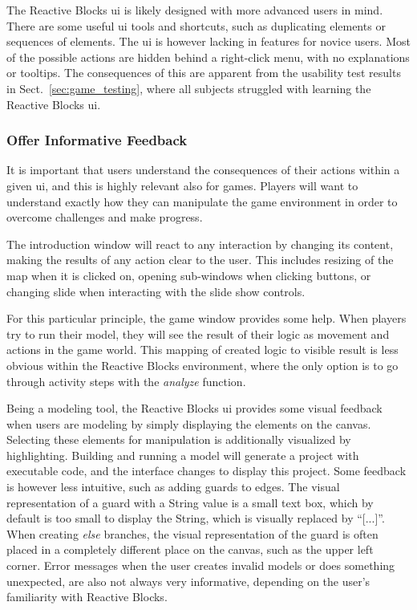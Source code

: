 \noindent
The Reactive Blocks \gls{ui} is likely designed with more advanced users in mind. There are some useful \gls{ui} tools and shortcuts, such as duplicating elements or sequences of elements. The \gls{ui} is however lacking in features for novice users. Most of the possible actions are hidden behind a right-click menu, with no explanations or tooltips. The consequences of this are apparent from the usability test results in Sect.~\ref{sec:game_testing}, where all subjects struggled with learning the Reactive Blocks \gls{ui}.

\subsubsection{Offer Informative Feedback}
It is important that users understand the consequences of their actions within a given \gls{ui}, and this is highly relevant also for games. Players will want to understand exactly how they can manipulate the game environment in order to overcome challenges and make progress.

\noindent
The introduction window will react to any interaction by changing its content, making the results of any action clear to the user. This includes resizing of the map when it is clicked on, opening sub-windows when clicking buttons, or changing slide when interacting with the slide show controls.

\noindent
For this particular principle, the game window provides some help. When players try to run their model, they will see the result of their logic as movement and actions in the game world. This mapping of created logic to visible result is less obvious within the Reactive Blocks environment, where the only option is to go through activity steps with the \emph{analyze} function.

\noindent
Being a modeling tool, the Reactive Blocks \gls{ui} provides some visual feedback when users are modeling by simply displaying the elements on the canvas. Selecting these elements for manipulation is additionally visualized by highlighting. Building and running a model will generate a project with executable code, and the interface changes to display this project. Some feedback is however less intuitive, such as adding guards to edges. The visual representation of a guard with a String value is a small text box, which by default is too small to display the String, which is visually replaced by ``[...]''. When creating \emph{else} branches, the visual representation of the guard is often placed in a completely different place on the canvas, such as the upper left corner. Error messages when the user creates invalid models or does something unexpected, are also not always very informative, depending on the user's familiarity with Reactive Blocks.

